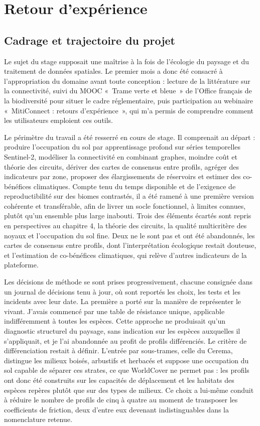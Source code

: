 \documentclass[a4paper,12pt]{report}
\begin{document}
\chapter{Retour d'expérience}
\section{Cadrage et trajectoire du projet}
Le sujet du stage supposait une maîtrise à la fois de l'écologie du paysage et du traitement de données spatiales. Le premier mois a donc été consacré à l'appropriation du domaine avant toute conception : lecture de la littérature sur la connectivité, suivi du MOOC «~Trame verte et bleue~» de l'Office français de la biodiversité pour situer le cadre réglementaire, puis participation au webinaire «~MitiConnect : retours d'expérience~», qui m'a permis de comprendre comment les utilisateurs emploient ces outils.

Le périmètre du travail a été resserré en cours de stage. Il comprenait au départ : produire l'occupation du sol par apprentissage profond sur séries temporelles Sentinel-2, modéliser la connectivité en combinant graphes, moindre coût et théorie des circuits, dériver des cartes de consensus entre profils, agréger des indicateurs par zone, proposer des élargissements de réservoirs et estimer des co-bénéfices climatiques. Compte tenu du temps disponible et de l'exigence de reproductibilité sur des biomes contrastés, il a été ramené à une première version cohérente et transférable, afin de livrer un socle fonctionnel, à limites connues, plutôt qu'un ensemble plus large inabouti. Trois des éléments écartés sont repris en perspectives au chapitre 4, la théorie des circuits, la qualité multicritère des noyaux et l'occupation du sol fine. Deux ne le sont pas et ont été abandonnés, les cartes de consensus entre profils, dont l'interprétation écologique restait douteuse, et l'estimation de co-bénéfices climatiques, qui relève d'autres indicateurs de la plateforme.

Les décisions de méthode se sont prises progressivement, chacune consignée dans un journal de décisions tenu à jour, où sont reportés les choix, les tests et les incidents avec leur date. La première a porté sur la manière de représenter le vivant. J'avais commencé par une table de résistance unique, applicable indifféremment à toutes les espèces. Cette approche ne produisait qu'un diagnostic structurel du paysage, sans indication sur les espèces auxquelles il s'appliquait, et je l'ai abandonnée au profit de profils différenciés. Le critère de différenciation restait à définir. L'entrée par sous-trames, celle du Cerema, distingue les milieux boisés, arbustifs et herbacés et suppose une occupation du sol capable de séparer ces strates, ce que WorldCover ne permet pas : les profils ont donc été construits sur les capacités de déplacement et les habitats des espèces repères plutôt que sur des types de milieux. Ce choix a lui-même conduit à réduire le nombre de profils de cinq à quatre au moment de transposer les coefficients de friction, deux d'entre eux devenant indistinguables dans la nomenclature retenue.
\end{document}

